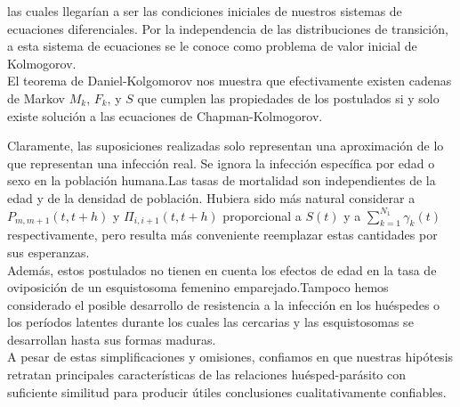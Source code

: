 las cuales llegarían a ser las condiciones iniciales de nuestros sistemas de ecuaciones diferenciales.
Por la independencia de las distribuciones de transición, a esta sistema de ecuaciones se le conoce como problema de valor inicial de Kolmogorov.\\ El teorema de Daniel-Kolgomorov nos muestra que efectivamente existen cadenas de Markov $M_k$, $F_k$, y $S$ que cumplen las propiedades de los postulados si y solo existe solución a las ecuaciones de Chapman-Kolmogorov.
\begin{Obs}
    Claramente, las suposiciones realizadas solo representan una aproximación de lo que representan una infección real. Se ignora la infección específica por edad o sexo en la población humana.Las tasas de mortalidad son independientes de la edad y de la densidad de población. Hubiera sido más natural considerar a $P_{m,m+1}(t,t+h)$ y $\Pi_{i,i+1}(t,t+h)$ proporcional a $S(t)$ y a $\sum_{k=1}^{N_1}\gamma_k(t)$ respectivamente, pero resulta más conveniente reemplazar estas cantidades por sus esperanzas.\\
    Además, estos postulados no tienen en cuenta los efectos de edad en la tasa de oviposición de un esquistosoma femenino emparejado.Tampoco hemos considerado el posible desarrollo de resistencia a la infección en los huéspedes o los períodos latentes durante los cuales las cercarias y las esquistosomas se desarrollan hasta sus formas maduras.\\A pesar de estas simplificaciones y omisiones, confiamos en que nuestras hipótesis retratan principales
    características de las relaciones huésped-parásito con suficiente similitud para producir útiles conclusiones cualitativamente confiables.
\end{Obs}
